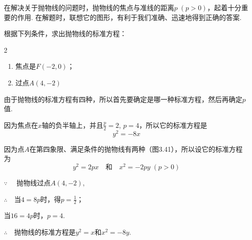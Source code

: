 \begin{remark}
    在解决关于抛物线的问题时，抛物线的焦点与准线的距离$p\; (p>0)$，起着十分重要的作用. 在解题时，联想它的图形，有利于我们准确、迅速地得到正确的答案.
\end{remark}


\begin{example}
    根据下列条件，求出抛物线的标准方程：
\begin{multicols}{2}
\begin{enumerate}[(1)]
 \item 焦点是$F(-2,0)$；   \item 过点$A(4,-2)$
\end{enumerate}
\end{multicols}
\end{example}

\begin{analyze}
    由于抛物线的标准方程有四种，所以首先要确定是哪一种标准方程，然后再确定$p$值.
\end{analyze}

\begin{solution}
\begin{enumerate}[(1)]
    \item 因为焦点在$x$轴的负半轴上，并且$\frac{p}{2}=2$, $p=4$，所以它的标准方程是\[y^2=-8x\]

\noindent
\begin{minipage}{.47\textwidth}
    \item 因为点$A$在第四象限、满足条件的抛物线有两种（图3.41），所以设它的标准方程为
    $$y^2=2px\quad \text{和}\quad  x^2=-2py\; (p>0)$$

$\because\quad$    抛物线过点$A(4,-2)$,

$\therefore\quad $当$4=8p$时，得$p=\frac{1}{2}$；

当$16=4p$时，$p=4$.

$\therefore\quad$抛物线的标准方程是$y^2=x$和$x^2=-8y$.
\end{minipage}
\hfill
\begin{minipage}{.5\textwidth}
\centering
{}
\end{minipage}
\end{enumerate}
\end{solution}


